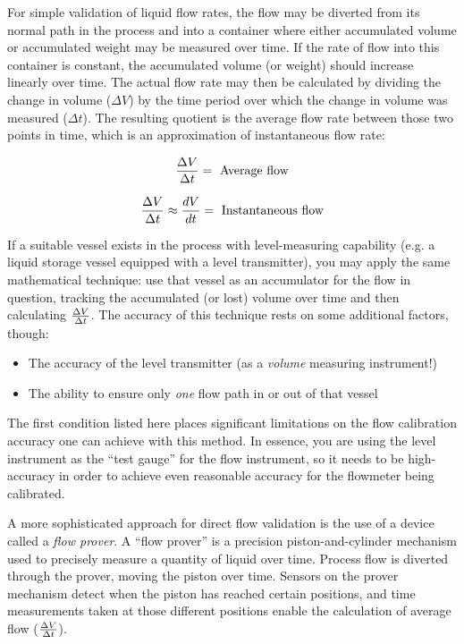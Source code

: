 For simple validation of liquid flow rates, the flow may be diverted from its normal path in the process and into a container where either accumulated volume or accumulated weight may be measured over time.  If the rate of flow into this container is constant, the accumulated volume (or weight) should increase linearly over time.  The actual flow rate may then be calculated by dividing the change in volume ($\Delta V$) by the time period over which the change in volume was measured ($\Delta t$).  The resulting quotient is the average flow rate between those two points in time, which is an approximation of instantaneous flow rate:

$${\Delta V \over \Delta t} = \hbox{ Average flow}$$

$${\Delta V \over \Delta t} \approx {dV \over dt} = \hbox{ Instantaneous flow}$$

If a suitable vessel exists in the process with level-measuring capability (e.g. a liquid storage vessel equipped with a level transmitter), you may apply the same mathematical technique: use that vessel as an accumulator for the flow in question, tracking the accumulated (or lost) volume over time and then calculating $\Delta V \over \Delta t$.  The accuracy of this technique rests on some additional factors, though:

\begin{itemize}
\item The accuracy of the level transmitter (as a \textit{volume} measuring instrument!)
\item The ability to ensure only \textit{one} flow path in or out of that vessel
\end{itemize}

The first condition listed here places significant limitations on the flow calibration accuracy one can achieve with this method.  In essence, you are using the level instrument as the ``test gauge'' for the flow instrument, so it needs to be high-accuracy in order to achieve even reasonable accuracy for the flowmeter being calibrated.

\vskip 10pt

A more sophisticated approach for direct flow validation is the use of a device called a \textit{flow prover}.  A ``flow prover'' is a precision piston-and-cylinder mechanism used to precisely measure a quantity of liquid over time.  Process flow is diverted through the prover, moving the piston over time.  Sensors on the prover mechanism detect when the piston has reached certain positions, and time measurements taken at those different positions enable the calculation of average flow ($\Delta V \over \Delta t$).    





